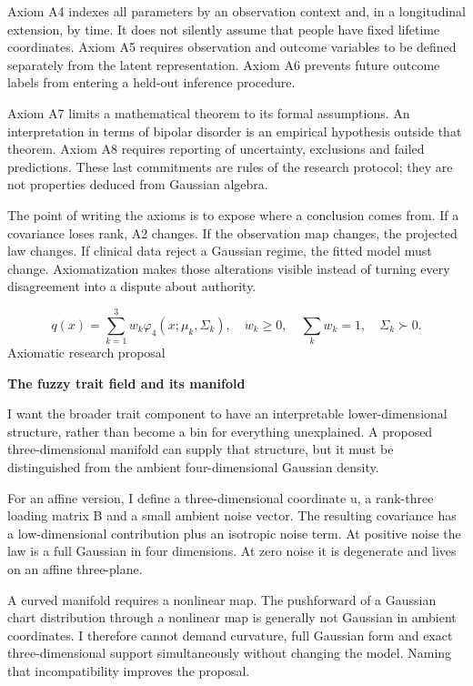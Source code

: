 \documentclass[10pt]{article}
\begin{document}
Axiom A4 indexes all parameters by an observation context and, in a longitudinal extension, by time. It does not silently assume that people have fixed lifetime coordinates. Axiom A5 requires observation and outcome variables to be defined separately from the latent representation. Axiom A6 prevents future outcome labels from entering a held-out inference procedure.\par
Axiom A7 limits a mathematical theorem to its formal assumptions. An interpretation in terms of bipolar disorder is an empirical hypothesis outside that theorem. Axiom A8 requires reporting of uncertainty, exclusions and failed predictions. These last commitments are rules of the research protocol; they are not properties deduced from Gaussian algebra.\par
The point of writing the axioms is to expose where a conclusion comes from. If a covariance loses rank, A2 changes. If the observation map changes, the projected law changes. If clinical data reject a Gaussian regime, the fitted model must change. Axiomatization makes those alterations visible instead of turning every disagreement into a dispute about authority.\par
\[q(x)=\sum_{k=1}^3w_k\varphi_4(x;\mu_k,\Sigma_k),\quad w_k\geq0,\quad\sum_kw_k=1,\quad\Sigma_k\succ0.\]
\clearpage
{\small\color{accent}Axiomatic research proposal}\par
{\LARGE\bfseries\color{ink}The fuzzy trait field and its manifold}\par\vspace{7pt}
I want the broader trait component to have an interpretable lower-dimensional structure, rather than become a bin for everything unexplained. A proposed three-dimensional manifold can supply that structure, but it must be distinguished from the ambient four-dimensional Gaussian density.\par
For an affine version, I define a three-dimensional coordinate u, a rank-three loading matrix B and a small ambient noise vector. The resulting covariance has a low-dimensional contribution plus an isotropic noise term. At positive noise the law is a full Gaussian in four dimensions. At zero noise it is degenerate and lives on an affine three-plane.\par
A curved manifold requires a nonlinear map. The pushforward of a Gaussian chart distribution through a nonlinear map is generally not Gaussian in ambient coordinates. I therefore cannot demand curvature, full Gaussian form and exact three-dimensional support simultaneously without changing the model. Naming that incompatibility improves the proposal.\par
\end{document}
